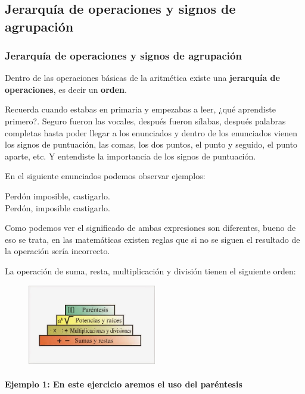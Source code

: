 \documentclass[11pt]{book}
\begin{document}
\chapter{}

\section{Jerarqu\'ia de operaciones y signos de agrupaci\'on}
\subsection{Jerarqu\'ia de operaciones y signos de agrupaci\'on}
Dentro de las operaciones básicas de la aritmética existe una \textbf{jerarquía de operaciones}, es decir un \textbf{orden}.

Recuerda cuando estabas en primaria y empezabas a leer, ¿qué aprendiste primero?. Seguro fueron las vocales, después fueron sílabas, después palabras completas hasta poder llegar a los enunciados y dentro de los enunciados vienen los signos de puntuación, las comas, los dos puntos, el punto y seguido, el punto aparte, etc. Y entendiste la importancia de los signos de puntuación.

En el siguiente enunciados podemos observar ejemplos:

Perdón imposible, castigarlo.\\
Perdón, imposible castigarlo.

Como podemos ver el significado de ambas expresiones son diferentes, bueno de eso se trata, en las matemáticas existen reglas que si no se siguen el resultado de la operación sería incorrecto.

La operación de suma, resta, multiplicación y división tienen el siguiente orden:
\begin{figure}[H]
  \centering
  \includegraphics[width=0.5\textwidth]{./Unidad 2/Images/jerarquia.jpg}
\end{figure}

\subsubsection{Ejemplo 1: En este ejercicio aremos el uso del paréntesis}
\end{document}
